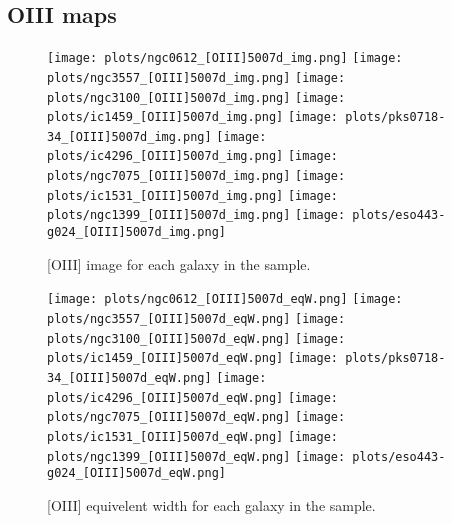 \documentclass[fleqn,usenatbib,useAMS]{mnras}
\begin{document}
    \subsection{OIII maps}
        \label{subsec:OIIImaps}
        \begin{figure*}
            \centering
            \texttt{[image: plots/ngc0612\_[OIII]5007d\_img.png]}
            \texttt{[image: plots/ngc3557\_[OIII]5007d\_img.png]}
            \texttt{[image: plots/ngc3100\_[OIII]5007d\_img.png]}
            \texttt{[image: plots/ic1459\_[OIII]5007d\_img.png]}
            \texttt{[image: plots/pks0718-34\_[OIII]5007d\_img.png]}
            \texttt{[image: plots/ic4296\_[OIII]5007d\_img.png]}
            \texttt{[image: plots/ngc7075\_[OIII]5007d\_img.png]}
            \texttt{[image: plots/ic1531\_[OIII]5007d\_img.png]}
            \texttt{[image: plots/ngc1399\_[OIII]5007d\_img.png]}
            \texttt{[image: plots/eso443-g024\_[OIII]5007d\_img.png]}
            \caption{[OIII] image for each galaxy in the sample.}
            \label{fig:OIII_img}
        \end{figure*}


        \begin{figure*}
            \centering
            \texttt{[image: plots/ngc0612\_[OIII]5007d\_eqW.png]}
            \texttt{[image: plots/ngc3557\_[OIII]5007d\_eqW.png]}
            \texttt{[image: plots/ngc3100\_[OIII]5007d\_eqW.png]}
            \texttt{[image: plots/ic1459\_[OIII]5007d\_eqW.png]}
            \texttt{[image: plots/pks0718-34\_[OIII]5007d\_eqW.png]}
            \texttt{[image: plots/ic4296\_[OIII]5007d\_eqW.png]}
            \texttt{[image: plots/ngc7075\_[OIII]5007d\_eqW.png]}
            \texttt{[image: plots/ic1531\_[OIII]5007d\_eqW.png]}
            \texttt{[image: plots/ngc1399\_[OIII]5007d\_eqW.png]}
            \texttt{[image: plots/eso443-g024\_[OIII]5007d\_eqW.png]}
            \caption{[OIII] equivelent width for each galaxy in the sample.}
            \label{fig:OIII_eqW}
        \end{figure*}
\end{document}
